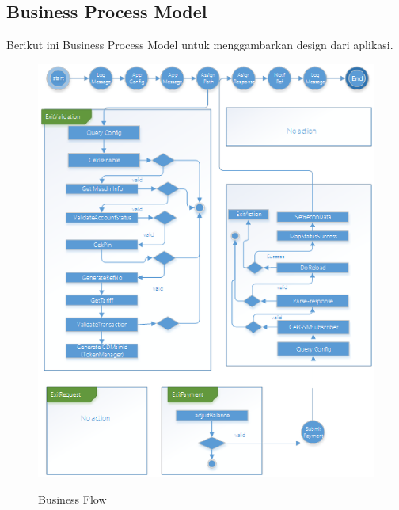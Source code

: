 \documentclass[9pt,twocolumn,twoside]{Gunadarma}
\begin{document}
\subsection{Business Process Model}
Berikut ini Business Process Model untuk menggambarkan design dari aplikasi. 
\begin{figure}[htbp]
\begin{center}
\includegraphics[width=1\columnwidth]{BusinessFlow-1.eps} \label{fig:3-noFCase1}
\end{center}
\caption{Business Flow}
\end{figure}
\\ \\ \\ \\ \\ \\ \\ \\ \\ \\ \\ \\ \\ \\ \\ \\ \\ \\ \\ \\ 
\end{document}
